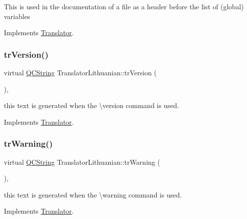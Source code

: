 This is used in the documentation of a file as a header before the list of (global) variables 

Implements \mbox{\hyperlink{class_translator}{Translator}}.

\mbox{\label{class_translator_lithuanian_a5bfe83043684f7bb111f772f01c4bc57}} 
\subsubsection{\texorpdfstring{trVersion()}{trVersion()}}
{\footnotesize\ttfamily virtual \mbox{\hyperlink{class_q_c_string}{Q\+C\+String}} Translator\+Lithuanian\+::tr\+Version (\begin{DoxyParamCaption}{ }\end{DoxyParamCaption})\hspace{0.3cm}{\ttfamily [inline]}, {\ttfamily [virtual]}}

this text is generated when the \textbackslash{}version command is used. 

Implements \mbox{\hyperlink{class_translator}{Translator}}.

\mbox{\label{class_translator_lithuanian_af6bdc7e70570377bf7a63836fed0972c}} 
\subsubsection{\texorpdfstring{trWarning()}{trWarning()}}
{\footnotesize\ttfamily virtual \mbox{\hyperlink{class_q_c_string}{Q\+C\+String}} Translator\+Lithuanian\+::tr\+Warning (\begin{DoxyParamCaption}{ }\end{DoxyParamCaption})\hspace{0.3cm}{\ttfamily [inline]}, {\ttfamily [virtual]}}

this text is generated when the \textbackslash{}warning command is used. 

Implements \mbox{\hyperlink{class_translator}{Translator}}.

\mbox{\label{class_translator_lithuanian_a5e2babe11037c29927de915157281d61}} 
